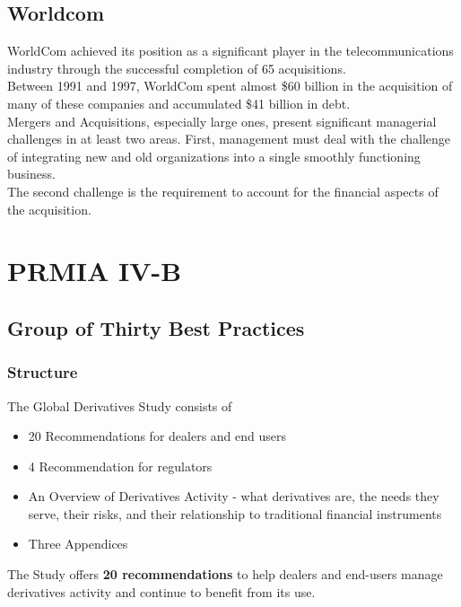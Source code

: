 \documentclass[12pt, a4paper]{report}
\begin{document}
\section{Worldcom}
WorldCom achieved its position as a significant player in the
telecommunications industry through the successful completion of
65 acquisitions. \\Between 1991 and 1997, WorldCom spent almost
\$60 billion in the acquisition of many of these companies and
accumulated \$41 billion in debt.  \\
Mergers and Acquisitions, especially large ones, present
significant managerial challenges in at least two areas. First,
management must deal with the challenge of integrating new and old
organizations into a single smoothly functioning business. \\The
second challenge is the requirement to account for the financial
aspects of the acquisition.

\chapter{PRMIA IV-B}
\section{Group of Thirty Best Practices }
\subsection{Structure}
The Global Derivatives Study consists of
\begin{itemize}
\item 20 Recommendations for dealers and end users \item 4
Recommendation for regulators \item An Overview of Derivatives
Activity  - what derivatives are, the needs they serve, their
risks, and their relationship to traditional financial
instruments\item Three Appendices
\end{itemize}

The Study offers \textbf{20 recommendations} to help dealers and
end-users manage derivatives activity and continue to benefit from
its use.
\end{document}
